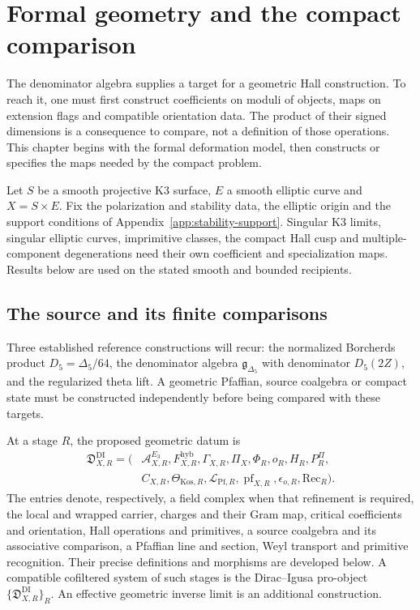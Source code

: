 \chapter{Formal geometry and the compact comparison}
\label{chap:dirac-igusa-pro-object}

The denominator algebra supplies a target for a geometric Hall
construction. To reach it, one must first construct coefficients
on moduli of objects, maps on extension flags and compatible
orientation data. The product of their signed dimensions is a
consequence to compare, not a definition of those operations.
This chapter begins with the formal deformation model, then
constructs or specifies the maps needed by the compact problem.

Let \(S\) be a smooth projective K3 surface, \(E\) a smooth
elliptic curve and \(X=S\times E\). Fix the polarization and
stability data, the elliptic origin and the support conditions of
Appendix~\ref{app:stability-support}. Singular K3 limits, singular
elliptic curves, imprimitive classes, the compact Hall cusp and
multiple-component degenerations need their own coefficient and
specialization maps. Results below are used on the stated smooth
and bounded recipients.

\section{The source and its finite comparisons}

Three established reference constructions will recur: the
normalized Borcherds product \(D_5=\Delta_5/64\), the denominator
algebra \(\mathfrak g_{\Delta_5}\) with denominator \(D_5(2Z)\),
and the regularized theta lift. A geometric Pfaffian, source
coalgebra or compact state must be constructed independently
before being compared with these targets.

At a stage \(R\), the proposed geometric datum is
\[
 \begin{split}
 \mathfrak D^{\mathrm{DI}}_{X,R}=
 (&\mathcal A_{X,R}^{E_3},F_{X,R}^{\mathrm{hyb}},
   \Gamma_{X,R},\Pi_X,\Phi_R,o_R,H_R,P_R^\Pi,\\
  &C_{X,R},\Theta_{\mathrm{Kos},R},
   \mathscr L_{\mathrm{Pf},R},\operatorname{pf}_{X,R},
   \epsilon_{o,R},\mathrm{Rec}_R).
 \end{split}
\]
The entries denote, respectively, a field complex when that
refinement is required, the local and wrapped carrier, charges
and their Gram map, critical coefficients and orientation,
Hall operations and primitives, a source coalgebra and its
associative comparison, a Pfaffian line and section, Weyl
transport and primitive recognition. Their precise definitions
and morphisms are developed below. A compatible cofiltered
system of such stages is the Dirac--Igusa pro-object
\(\{\mathfrak D^{\mathrm{DI}}_{X,R}\}_R\). An effective
geometric inverse limit is an additional construction.

